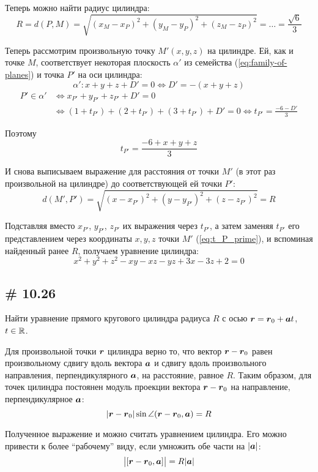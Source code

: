 \documentclass[a4paper,12pt]{article}
\begin{document}
\begin{solution}
    Теперь можно найти радиус цилиндра:
    \[
      R = d(P, M) = \sqrt{(x_M - x_P)^2 + (y_M - y_P)^2 + (z_M - z_P)^2} = \ldots = \frac{\sqrt{6}}{3}
    \]
    
    Теперь рассмотрим произвольную точку $M'(x, y, z)$ на цилиндре.
    Ей, как и точке $M$, соответствует некоторая плоскость $\alpha'$ из семейства (\ref{eq:family-of-planes}) и точка $P'$ на оси цилиндра:
    \[
      \alpha'\colon x + y + z + D' = 0 \Leftrightarrow D' = -(x + y + z)
    \]
    \begin{equation}
    \begin{split}
      P' \in \alpha' &\Leftrightarrow x_{P'} + y_{P'} + z_{P'} + D' = 0\\
      &\Leftrightarrow (1 + t_{P'}) + (2 + t_{P'}) + (3 + t_{P'}) + D' = 0
      \Leftrightarrow t_{P'} = \frac{-6 - D'}{3}
    \end{split}
    \end{equation}
    
    Поэтому
    \begin{equation}
      \label{eq:t_P_prime}
      t_{P'} = \frac{-6 + x + y + z}{3}
    \end{equation}
    
    И снова выписываем выражение для расстояния от точки $M'$ (в этот раз произвольной на цилиндре) до соответствующей ей точки $P'$:
    \[
      d(M', P') = \sqrt{(x - x_{P'})^2 + (y - y_{P'})^2 + (z - z_{P'})^2} = R
    \]
    
    Подставляя вместо $x_{P'}$, $y_{P'}$, $z_{P'}$ их выражения через $t_{P'}$, а затем заменяя $t_{P'}$ его представлением через координаты $x, y, z$ точки $M'$ (\ref{eq:t_P_prime}), и вспоминая найденный ранее $R$, получаем уравнение цилиндра:
    \[
      x^2 + y^2 + z^2 - xy - xz - yz + 3x - 3z + 2 = 0
    \]
  \end{solution}
  
  
  \subsection{\# 10.26}
  
  Найти уравнение прямого кругового цилиндра радиуса $R$ с осью $\bds r \hm= \bds r_0 + \bds a t$, $t \hm\in \RR$.
  
  \begin{solution}
    
    Для произвольной точки $\boldsymbol r$ цилиндра верно то, что вектор $\bds r \hm- \bds r_0$ равен произвольному сдвигу вдоль вектора $\boldsymbol a$ и сдвигу вдоль произвольного направления, перпендикулярного $\boldsymbol a$, на расстояние, равное $R$.
    Таким образом, для точек цилиндра постоянен модуль проекции вектора $\bds r \hm- \bds r_0$ на направление, перпендикулярное $\boldsymbol a$:
    \[
      |\boldsymbol r - \boldsymbol r_0| \sin\angle{(\boldsymbol r - \boldsymbol r_0, \boldsymbol a)} = R
    \]
    
    Полученное выражение и можно считать уравнением цилиндра.
    Его можно привести к более ``рабочему'' виду, если умножить обе части на $|\boldsymbol a|$:
    \[
      \bigl|[\boldsymbol r - \boldsymbol r_0, \boldsymbol a]\bigr| = R |\boldsymbol a|
    \]
  \end{solution}
  
\end{document}
